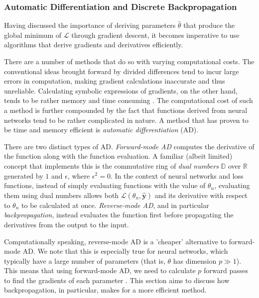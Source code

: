 \documentclass[a4paper,11pt,titlepage]{article}
\theoremstyle{definition}
\theoremstyle{plain}
\theoremstyle{remark}
\begin{document}
\subsubsection{Automatic Differentiation and Discrete Backpropagation}
\label{sec:ad}

Having discussed the importance of deriving parameters $\hat{\theta}$ that produce the global minimum of $\mathcal{L}$ through gradient descent, it becomes imperative to use algorithms that derive gradients and derivatives efficiently.

There are a number of methods that do so with varying computational costs. The conventional ideas brought forward by divided differences tend to incur large errors in computation, making gradient calculations inaccurate and thus unreliable. Calculating symbolic expressions of gradients, on the other hand, tends to be rather memory and time consuming \cite{tucker2011}. The computational cost of such a method is further compounded by the fact that functions derived from neural networks tend to be rather complicated in nature. A method that has proven to be time and memory efficient is \textit{automatic differentiation} (AD).

There are two distinct types of AD. \textit{Forward-mode AD} computes the derivative of the function along with the function evaluation. A familiar (albeit limited) concept that implements this is the commutative ring of \textit{dual numbers} $\mathbb{D}$ over $\mathbb{R}$ generated by $1$ and $\epsilon$, where $\epsilon^2 = 0$. In the context of neural networks and loss functions, instead of simply evaluating functions with the value of $\theta_n$, evaluating them using dual numbers allows both $\mathcal{L}(\theta_n, \mathbf{\hat{y}})$ and its derivative with respect to $\theta_n$ to be calculated at once. \textit{Reverse-mode AD}, and in particular \textit{backpropagation}, instead evaluates the function first before propagating the derivatives from the output to the input. 

Computationally speaking, reverse-mode AD is a 'cheaper' alternative to forward-mode AD. We note that this is especially true for neural networks, which typically have a large number of parameters (that is, $\theta$ has dimension $p \gg 1$). This means that using forward-mode AD, we need to calculate $p$ forward passes to find the gradients of each parameter \cite{griewank2008}. This section aims to discuss how backpropagation, in particular, makes for a more efficient method.
\end{document}
